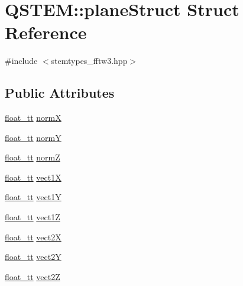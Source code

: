 \hypertarget{struct_q_s_t_e_m_1_1plane_struct}{\section{Q\-S\-T\-E\-M\-:\-:plane\-Struct Struct Reference}
\label{struct_q_s_t_e_m_1_1plane_struct}
}


{\ttfamily \#include $<$stemtypes\-\_\-fftw3.\-hpp$>$}

\subsection*{Public Attributes}
\begin{DoxyCompactItemize}
\item 
\hyperlink{namespace_q_s_t_e_m_a915d7caa497280d9f927c4ce8d330e47}{float\-\_\-tt} \hyperlink{struct_q_s_t_e_m_1_1plane_struct_ab580171d39c0cd8b5685fe2f2791be88}{norm\-X}
\item 
\hyperlink{namespace_q_s_t_e_m_a915d7caa497280d9f927c4ce8d330e47}{float\-\_\-tt} \hyperlink{struct_q_s_t_e_m_1_1plane_struct_ae9d37bcf39da1062bc97c0908c6cb5a1}{norm\-Y}
\item 
\hyperlink{namespace_q_s_t_e_m_a915d7caa497280d9f927c4ce8d330e47}{float\-\_\-tt} \hyperlink{struct_q_s_t_e_m_1_1plane_struct_a367a661f4ef249286b60d47e412c1320}{norm\-Z}
\item 
\hyperlink{namespace_q_s_t_e_m_a915d7caa497280d9f927c4ce8d330e47}{float\-\_\-tt} \hyperlink{struct_q_s_t_e_m_1_1plane_struct_aa86cc6f57f738af42daaf8f3ea11f8dd}{vect1\-X}
\item 
\hyperlink{namespace_q_s_t_e_m_a915d7caa497280d9f927c4ce8d330e47}{float\-\_\-tt} \hyperlink{struct_q_s_t_e_m_1_1plane_struct_a39d87483fd7812e56e4af6d16452cec7}{vect1\-Y}
\item 
\hyperlink{namespace_q_s_t_e_m_a915d7caa497280d9f927c4ce8d330e47}{float\-\_\-tt} \hyperlink{struct_q_s_t_e_m_1_1plane_struct_a1cd9d66faa16a0eaa60d9f65641ab1fc}{vect1\-Z}
\item 
\hyperlink{namespace_q_s_t_e_m_a915d7caa497280d9f927c4ce8d330e47}{float\-\_\-tt} \hyperlink{struct_q_s_t_e_m_1_1plane_struct_aeafa46b7443b448d08d2392835d97b04}{vect2\-X}
\item 
\hyperlink{namespace_q_s_t_e_m_a915d7caa497280d9f927c4ce8d330e47}{float\-\_\-tt} \hyperlink{struct_q_s_t_e_m_1_1plane_struct_a386edca99c095a1ae400468bf496c95e}{vect2\-Y}
\item 
\hyperlink{namespace_q_s_t_e_m_a915d7caa497280d9f927c4ce8d330e47}{float\-\_\-tt} \hyperlink{struct_q_s_t_e_m_1_1plane_struct_a971c6351788d11b711f6ccecedb201f9}{vect2\-Z}

\end{DoxyCompactItemize}

